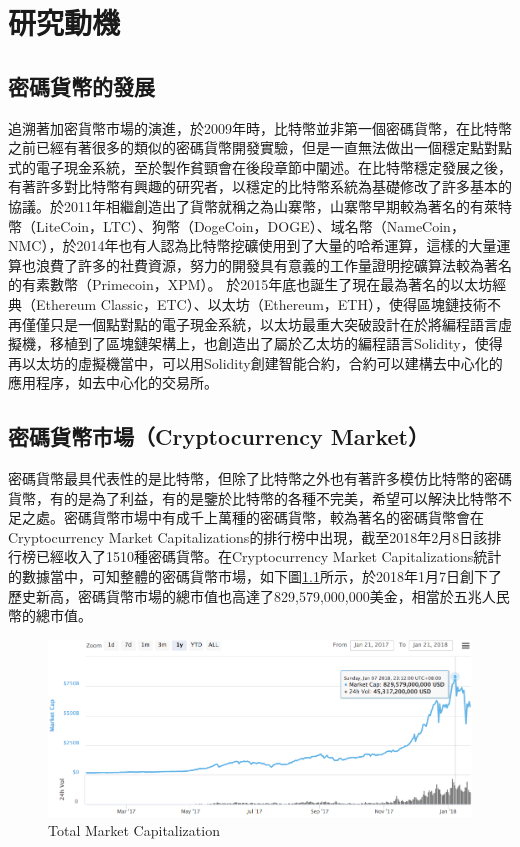 
\chapter{研究動機}
	\section{密碼貨幣的發展}
	追溯著加密貨幣市場的演進，於2009年時，比特幣並非第一個密碼貨幣，在比特幣之前已經有著很多的類似的密碼貨幣開發實驗，但是一直無法做出一個穩定點對點式的電子現金系統，至於製作貧頸會在後段章節中闡述。在比特幣穩定發展之後，有著許多對比特幣有興趣的研究者，以穩定的比特幣系統為基礎修改了許多基本的協議。於2011年相繼創造出了貨幣就稱之為山寨幣，山寨幣早期較為著名的有萊特幣（LiteCoin，LTC）\parencite{litecoin}、狗幣（DogeCoin，DOGE）\parencite{dogecoin}、域名幣（NameCoin，NMC）\parencite{namecoin}，於2014年也有人認為比特幣挖礦使用到了大量的哈希運算，這樣的大量運算也浪費了許多的社費資源，努力的開發具有意義的工作量證明挖礦算法較為著名的有素數幣（Primecoin，XPM）\parencite{primecoin}。 於2015年底也誕生了現在最為著名的以太坊經典（Ethereum Classic，ETC）\parencite{ethereumclassic}、以太坊（Ethereum，ETH）\parencite{ethereum}，使得區塊鏈技術不再僅僅只是一個點對點的電子現金系統，以太坊最重大突破設計在於將編程語言虛擬機，移植到了區塊鏈架構上，也創造出了屬於乙太坊的編程語言Solidity，使得再以太坊的虛擬機當中，可以用Solidity創建智能合約，合約可以建構去中心化的應用程序，如去中心化的交易所。

	\section{密碼貨幣市場（Cryptocurrency Market）}
	密碼貨幣最具代表性的是比特幣，但除了比特幣之外也有著許多模仿比特幣的密碼貨幣，有的是為了利益，有的是鑒於比特幣的各種不完美，希望可以解決比特幣不足之處。密碼貨幣市場中有成千上萬種的密碼貨幣，較為著名的密碼貨幣會在Cryptocurrency Market Capitalizations\parencite{CryptocurrencyMarketCapitalizations}的排行榜中出現，截至2018年2月8日該排行榜已經收入了1510種密碼貨幣。在Cryptocurrency Market Capitalizations統計的數據當中，可知整體的密碼貨幣市場，如下圖\ref{TotalMarketCapitalization}所示，於2018年1月7日創下了歷史新高，密碼貨幣市場的總市值也高達了829,579,000,000美金，相當於五兆人民幣的總市值。

		\begin{figure}[h]
			\centering
			\includegraphics[width = .9\textwidth]{TotalMarketCapitalization.png}
			\caption{Total Market Capitalization\parencite{CryptocurrencyMarketCapitalizations}}\label{TotalMarketCapitalization}
		\end{figure}

